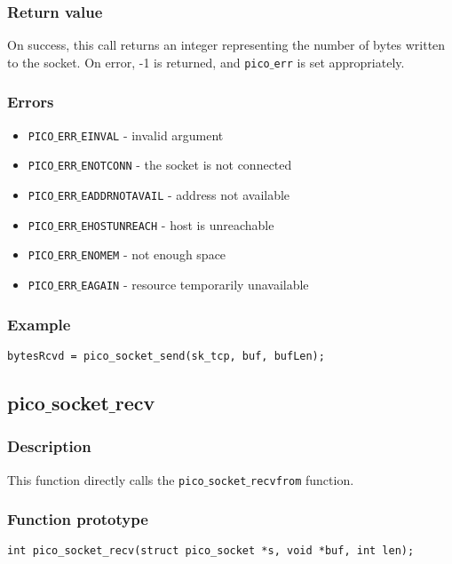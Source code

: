 \subsubsection*{Return value}
On success, this call returns an integer representing the number of bytes written to
the socket. On error, -1 is returned, and \texttt{pico$\_$err} is set appropriately.

\subsubsection*{Errors}
\begin{itemize}[noitemsep]
\item \texttt{PICO$\_$ERR$\_$EINVAL} - invalid argument
\item \texttt{PICO$\_$ERR$\_$ENOTCONN} - the socket is not connected
\item \texttt{PICO$\_$ERR$\_$EADDRNOTAVAIL} - address not available
\item \texttt{PICO$\_$ERR$\_$EHOSTUNREACH} - host is unreachable
\item \texttt{PICO$\_$ERR$\_$ENOMEM} - not enough space
\item \texttt{PICO$\_$ERR$\_$EAGAIN} - resource temporarily unavailable
\end{itemize}

\subsubsection*{Example}
\begin{verbatim}
bytesRcvd = pico_socket_send(sk_tcp, buf, bufLen);
\end{verbatim}


\subsection{pico$\_$socket$\_$recv}

\subsubsection*{Description}
This function directly calls the \texttt{pico$\_$socket$\_$recvfrom} function.

\subsubsection*{Function prototype}
\begin{verbatim}
int pico_socket_recv(struct pico_socket *s, void *buf, int len);
\end{verbatim}

